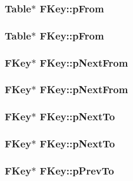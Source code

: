 \subsubsection{\setlength{\rightskip}{0pt plus 5cm}\bf{Table}$\ast$ \bf{FKey::p\-From}}\label{structFKey_642be9155ed0b643dbb1480661a3c57d}


\subsubsection{\setlength{\rightskip}{0pt plus 5cm}\bf{Table}$\ast$ \bf{FKey::p\-From}}\label{structFKey_642be9155ed0b643dbb1480661a3c57d}


\subsubsection{\setlength{\rightskip}{0pt plus 5cm}\bf{FKey}$\ast$ \bf{FKey::p\-Next\-From}}\label{structFKey_750839083b1aae9691a1aa1fd335169a}


\subsubsection{\setlength{\rightskip}{0pt plus 5cm}\bf{FKey}$\ast$ \bf{FKey::p\-Next\-From}}\label{structFKey_750839083b1aae9691a1aa1fd335169a}


\subsubsection{\setlength{\rightskip}{0pt plus 5cm}\bf{FKey}$\ast$ \bf{FKey::p\-Next\-To}}\label{structFKey_45fdb463d842845b3aad89c4b67e019c}


\subsubsection{\setlength{\rightskip}{0pt plus 5cm}\bf{FKey}$\ast$ \bf{FKey::p\-Next\-To}}\label{structFKey_45fdb463d842845b3aad89c4b67e019c}


\subsubsection{\setlength{\rightskip}{0pt plus 5cm}\bf{FKey}$\ast$ \bf{FKey::p\-Prev\-To}}\label{structFKey_997b06468f0a3187ca907072c1a129ea}


